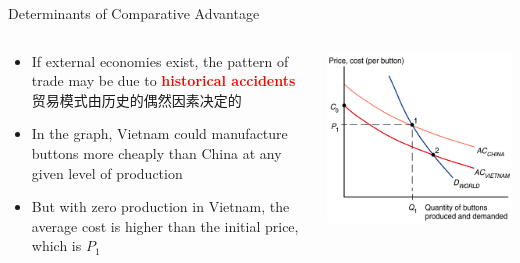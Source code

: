 \documentclass[10pt,hyperref={CJKbookmarks=true},xcolor=dvipsnames,aspectratio=169]{beamer}
\begin{document}
\begin{frame}{Determinants of Comparative Advantage}


\begin{columns}[onlytextwidth]
\begin{column}{0.5\textwidth}
\begin{itemize}
\item If external economies exist, the pattern of trade may be due to \textbf{\textcolor{red}{historical
accidents}} 贸易模式由历史的偶然因素决定的
\item In the graph, Vietnam could manufacture buttons more cheaply than
China at any given level of production 
\item But with zero production in Vietnam, the average cost is higher than
the initial price, which is $P_{1}$
\end{itemize}

\end{column}
\begin{column}{0.5\textwidth}
\includegraphics[width=\columnwidth]{fig/krugman/lec6-9}
\end{column}
\end{columns}

\end{frame}
\end{document}
